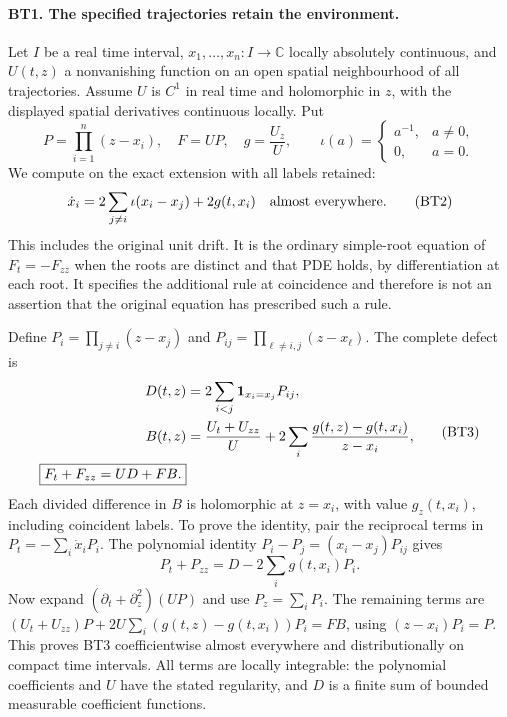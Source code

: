 \documentclass[11pt,a4paper]{article}
\theoremstyle{definition}\newtheorem{definition}[theorem]{Definition}
\begin{document}
\paragraph{BT1. The specified trajectories retain the environment.}
Let $I$ be a real time interval, $x_1,\ldots,x_n:I\to\mathbb C$
locally absolutely continuous, and $U(t,z)$ a nonvanishing function
on an open spatial neighbourhood of all trajectories. Assume $U$ is
$C^1$ in real time and holomorphic in $z$, with the displayed spatial
derivatives continuous locally. Put
\[
 P=\prod_{i=1}^n(z-x_i),\quad F=UP,\quad
 g=\frac{U_z}{U},\qquad
 \iota(a)=\begin{cases}a^{-1},&a\ne0,\\0,&a=0.\end{cases}
 \tag{BT1}
\]
We compute on the exact extension with all labels retained:
\[
 \dot x_i=2\sum_{j\ne i}\iota(x_i-x_j)+2g(t,x_i)
 \quad\hbox{almost everywhere.}
 \tag{BT2}
\]
This includes the original unit drift. It is the ordinary simple-root
equation of $F_t=-F_{zz}$ when the roots are distinct and that PDE
holds, by differentiation at each root. It specifies the additional
rule at coincidence and therefore is not an assertion that the
original equation has prescribed such a rule.

Define $P_i=\prod_{j\ne i}(z-x_j)$ and
$P_{ij}=\prod_{\ell\ne i,j}(z-x_\ell)$. The complete defect is
\[
\begin{split}
 D(t,z)&=2\sum_{i<j}{\bf1}_{x_i=x_j}P_{ij},\\
 B(t,z)&=\frac{U_t+U_{zz}}{U}
       +2\sum_i\frac{g(t,z)-g(t,x_i)}{z-x_i},\\
 \boxed{F_t+F_{zz}=U D+F B.}
\end{split}\tag{BT3}
\]
Each divided difference in $B$ is holomorphic at $z=x_i$, with
value $g_z(t,x_i)$, including coincident labels.
To prove the identity, pair the reciprocal terms in
$P_t=-\sum_i\dot x_iP_i$. The polynomial identity
$P_i-P_j=(x_i-x_j)P_{ij}$ gives
\[
 P_t+P_{zz}=D-2\sum_i g(t,x_i)P_i.
 \tag{BT4}
\]
Now expand $(\partial_t+\partial_z^2)(UP)$ and use
$P_z=\sum_iP_i$. The remaining terms are
$(U_t+U_{zz})P+2U\sum_i(g(t,z)-g(t,x_i))P_i=FB$,
using $(z-x_i)P_i=P$. This proves BT3
coefficientwise almost everywhere and distributionally on compact
time intervals. All terms are locally integrable: the polynomial
coefficients and $U$ have the stated regularity, and $D$ is a finite
sum of bounded measurable coefficient functions.
\end{document}
